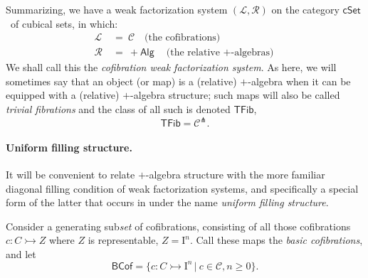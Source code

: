\documentclass[12pt]{article}
\newcommand{\cSet}{\ensuremath{\mathsf{cSet}}}
\newcommand{\mono}{\ensuremath{\rightarrowtail}}
\newcommand{\I}{\ensuremath{\mathrm{I}}}
\theoremstyle{remark}
\theoremstyle{definition}
\begin{document}
Summarizing, we have a weak factorization system $(\mathcal{L}, \mathcal{R})$ on the category \cSet\ of cubical sets, in which:
\begin{align*}
\mathcal{L}\ &=\ \mathcal{C}\quad \text{(the cofibrations)}\\
\mathcal{R}\ &=\ +\mathsf{Alg}\quad \text{(the relative $+$-algebras)}
\end{align*}
We shall call this the \emph{cofibration weak factorization system}. As here, we will sometimes say that an object (or map) is a (relative) $+$-algebra when it can be equipped with a (relative) $+$-algebra structure; such maps will also be called \emph{trivial fibrations} and the class of all such is denoted $\mathsf{TFib}$,
\[
\mathsf{TFib} = \mathcal{C}^\pitchfork.
\]

\paragraph{Uniform filling structure.}

It will be convenient to relate $+$-algebra structure with the more familiar diagonal filling condition of weak factorization systems, and specifically a special form of the latter that occurs in \cite{CCHM} under the name \emph{uniform filling structure}. 

Consider a generating sub\emph{set} of cofibrations, consisting of all those cofibrations $c : C \mono Z$ where $Z$ is representable,  $Z=\I^n$.  Call these maps the \emph{basic cofibrations}, and let 
\begin{equation}\label{eq:basiccof}
\mathsf{BCof} = \{c : C\mono \I^n\,|\ c\in \mathcal{C}, n\geq 0 \}.
\end{equation}
\end{document}
